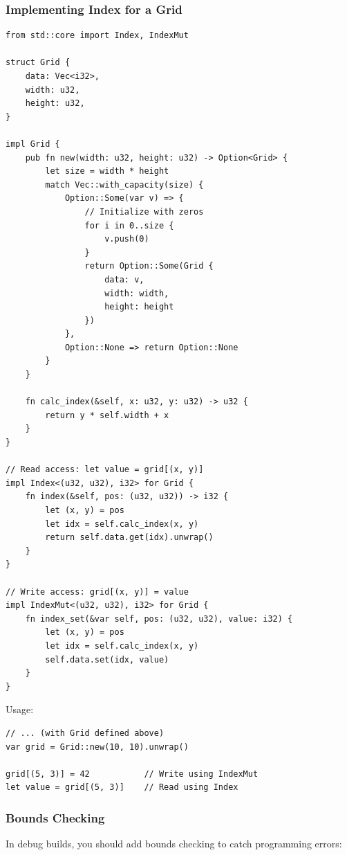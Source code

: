 \subsubsection{Implementing Index for a Grid}

\begin{lstlisting}
from std::core import Index, IndexMut

struct Grid {
    data: Vec<i32>,
    width: u32,
    height: u32,
}

impl Grid {
    pub fn new(width: u32, height: u32) -> Option<Grid> {
        let size = width * height
        match Vec::with_capacity(size) {
            Option::Some(var v) => {
                // Initialize with zeros
                for i in 0..size {
                    v.push(0)
                }
                return Option::Some(Grid {
                    data: v,
                    width: width,
                    height: height
                })
            },
            Option::None => return Option::None
        }
    }

    fn calc_index(&self, x: u32, y: u32) -> u32 {
        return y * self.width + x
    }
}

// Read access: let value = grid[(x, y)]
impl Index<(u32, u32), i32> for Grid {
    fn index(&self, pos: (u32, u32)) -> i32 {
        let (x, y) = pos
        let idx = self.calc_index(x, y)
        return self.data.get(idx).unwrap()
    }
}

// Write access: grid[(x, y)] = value
impl IndexMut<(u32, u32), i32> for Grid {
    fn index_set(&var self, pos: (u32, u32), value: i32) {
        let (x, y) = pos
        let idx = self.calc_index(x, y)
        self.data.set(idx, value)
    }
}
\end{lstlisting}

Usage:

\begin{lstlisting}
// ... (with Grid defined above)
var grid = Grid::new(10, 10).unwrap()

grid[(5, 3)] = 42           // Write using IndexMut
let value = grid[(5, 3)]    // Read using Index
\end{lstlisting}

\subsubsection{Bounds Checking}

In debug builds, you should add bounds checking to catch programming errors:

